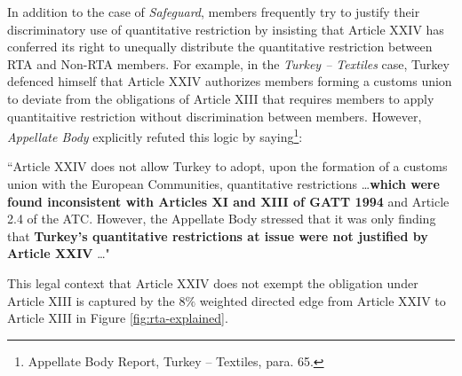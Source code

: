 In addition to the case of \textit{Safeguard},
members frequently try to justify their discriminatory
use of quantitative restriction by insisting that Article XXIV
has conferred its right to unequally distribute the quantitative restriction between RTA and Non-RTA members.
For example, in the \textit{Turkey – Textiles} case, Turkey defenced himself that Article XXIV authorizes
members forming a customs union to deviate from the obligations of Article XIII that requires members to apply quantitaitive restriction without discrimination between members.
However, \textit{Appellate Body} explicitly refuted this logic by saying\footnote{Appellate Body Report, Turkey – Textiles, para. 65.}:
\begin{displayquote}[][]
   ``Article XXIV does not allow Turkey to adopt, upon the
   formation of a customs union with the European Communities, quantitative restrictions \ldots \textbf{which
   were found inconsistent with Articles XI and XIII of GATT 1994} and Article 2.4 of the ATC.
   However, the Appellate Body stressed that it was only finding that \textbf{Turkey's quantitative
   restrictions at issue were not justified by Article XXIV} \ldots"
\end{displayquote}
This legal context that Article XXIV does not exempt the obligation under Article XIII is captured by the $8\%$ weighted directed edge from Article XXIV to Article XIII in Figure \ref{fig:rta-explained}.
 
 
 
 
 
 

